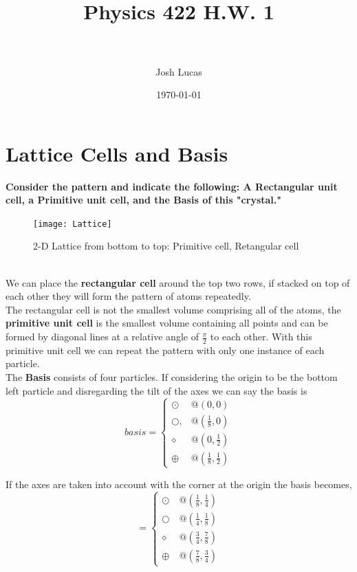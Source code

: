 \documentclass[paper=a4, fontsize=11pt]{scrartcl} %
\title{	
\normalfont \normalsize  %
\horrule{0.5pt} \\[0.4cm] %
\huge Physics 422 H.W. 1\\ %
\horrule{2pt} \\[0.5cm] %
}
\author{Josh Lucas} %
\date{\normalsize\today} %
\numberwithin{equation}{section} %
\numberwithin{figure}{section} %
\numberwithin{table}{section} %
\begin{document}
\maketitle %


\section{Lattice Cells and Basis}
\textbf{Consider the pattern and indicate the following: A \textbf{Rectangular unit cell}, a \textbf{Primitive unit cell}, and the \textbf{Basis} of this "crystal."}\\
\begin{figure}
\texttt{[image: Lattice]}
\caption{2-D Lattice from bottom to top: Primitive cell, Retangular cell}
\end{figure}\\
We can place the \textbf{rectangular cell} around the top two rows, if stacked on top of each other they will form the pattern of atoms repeatedly.\\ The rectangular cell is not the smallest volume comprising all of the atoms, the \textbf{primitive unit cell} is the smallest volume containing all points and can be formed by diagonal lines at a relative angle of $\frac{\pi}{2}$ to each other. With this primitive unit cell we can repeat the pattern with only one instance of each particle.\\
The \textbf{Basis} consists of four particles. If considering the origin to be the bottom left particle and disregarding the tilt of the axes we can say the basis is 
\begin{equation*}
basis = \begin{cases} \odot\  & @ (0,0) \\ \bigcirc , & @ (\frac{1}{8},0) \\ \diamond & @ (0,\frac{1}{2}) \\ \oplus &  @(\frac{1}{8},\frac{1}{2}) \end{cases}
\end{equation*} 

If the axes are taken into account with the corner at the origin the basis becomes,
\begin{equation*}
 = \begin{cases} \odot\  & @ (\frac{1}{8},\frac{1}{4}) \\ \bigcirc  & @ (\frac{1}{4},\frac{1}{8}) \\ \diamond & @ (\frac{3}{4},\frac{7}{8}) \\ \oplus &  @(\frac{7}{8},\frac{3}{4}) \end{cases}
\end{equation*} 
\end{document}
